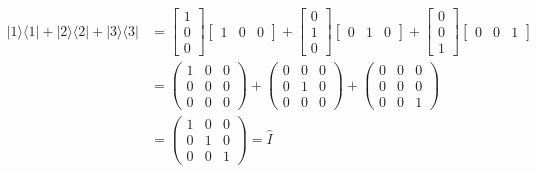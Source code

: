 \documentclass[letter]{article}
\begin{document}
\begin{align*}
	| 1 \rangle \langle 1 |  + | 2 \rangle \langle 2 |  + | 3 \rangle \langle 3 |  &
= \begin{bmatrix} 1\\0\\0 \end{bmatrix} \begin{bmatrix} 1&0&0 \end{bmatrix} + 
\begin{bmatrix} 0\\1\\0 \end{bmatrix} \begin{bmatrix} 0&1&0 \end{bmatrix} + 
\begin{bmatrix} 0\\0\\1 \end{bmatrix} \begin{bmatrix} 0&0&1 \end{bmatrix} \\ 
						       & =
\begin{pmatrix} 1&0&0\\0&0&0\\0&0&0 \end{pmatrix} +
\begin{pmatrix} 0&0&0\\0&1&0\\0&0&0 \end{pmatrix} + 
\begin{pmatrix} 0&0&0\\0&0&0\\0&0&1 \end{pmatrix} \\  
		 &= \begin{pmatrix} 1&0&0\\0&1&0\\0&0&1 \end{pmatrix} = \hat{I} 
\end{align*}
\end{document}
